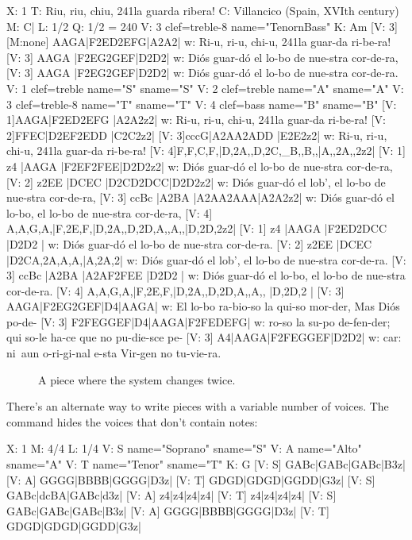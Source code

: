 \documentclass[a4paper,fullpage,12pt]{book}
\begin{document}
{\small
\begin{abcsource}
X: 1
T: Riu, riu, chiu, \bl{}241la guarda ribera!
C: Villancico (Spain, XVIth century)
M: C|
L: 1/2
Q: 1/2 = 240
V: 3 clef=treble-8 name="Tenor\bl{}nBass"
K: Am
[V: 3] [M:none] AAGA|F2ED2EFG|A2A2|
w: Ri-u, ri-u, chi-u, \bl{}241la guar-da ri-be-ra!
[V: 3] AAGA         |F2EG2GEF|D2D2|
w: Di\'os guar-d\'o el lo-bo de nue-stra cor-de-ra,
[V: 3] AAGA         |F2EG2GEF|D2D2|
w: Di\'os guar-d\'o el lo-bo de nue-stra cor-de-ra.
V: 1 clef=treble   name="S" sname="S"
V: 2 clef=treble   name="A" sname="A"
V: 3 clef=treble-8 name="T" sname="T"
V: 4 clef=bass     name="B" sname="B"
[V: 1]AAGA|F2ED2EFG |A2A2z2|
w: Ri-u, ri-u, chi-u, \bl{}241la guar-da ri-be-ra!
[V: 2]FFEC|D2EF2EDD |C2C2z2|
[V: 3]cccG|A2AA2ADD |E2E2z2|
w: Ri-u, ri-u, chi-u, \bl{}241la guar-da ri-be-ra!
[V: 4]F,F,C,F,|D,2A,,D,2C,_B,,B,,|A,,2A,,2z2|
%
[V: 1] z4      |AAGA   |F2EF2FEE|D2D2z2|
w: Di\'os guar-d\'o el lo-bo de nue-stra cor-de-ra,
[V: 2] z2EE    |DCEC   |D2CD2DCC|D2D2z2|
w: Di\'os guar-d\'o el lob', el lo-bo de nue-stra cor-de-ra,
[V: 3] ccBc    |A2BA   |A2AA2AAA|A2A2z2|
w: Di\'os guar-d\'o el lo-bo, el lo-bo de nue-stra cor-de-ra,
[V: 4] A,A,G,A,|F,2E,F,|D,2A,,D,2D,A,,A,,|D,2D,2z2|
%
[V: 1] z4      |AAGA   |F2ED2DCC    |D2D2  |
w: Di\'os guar-d\'o el lo-bo de nue-stra cor-de-ra.
[V: 2] z2EE    |DCEC   |D2CA,2A,A,A,|A,2A,2|
w: Di\'os guar-d\'o el lob', el lo-bo de nue-stra cor-de-ra.
[V: 3] ccBc    |A2BA   |A2AF2FEE    |D2D2  |
w: Di\'os guar-d\'o el lo-bo, el lo-bo de nue-stra cor-de-ra.
[V: 4] A,A,G,A,|F,2E,F,|D,2A,,D,2D,A,,A,,  |D,2D,2  |
[V: 3] AAGA|F2EG2GEF|D4|AAGA|
w: El lo-bo ra-bio-so la qui-so mor-der, Mas Di\'os po-de-
[V: 3] F2FEGGEF|D4|AAGA|F2FEDEFG|
w: ro-so la su-po de-fen-der; qui so-le ha-ce que no pu-die-sce pe-
[V: 3] A4|AAGA|F2FEGGEF|D2D2|
w: car: ni~aun o-ri-gi-nal e-sta Vir-gen no tu-vie-ra.
\end{abcsource}
}

\begin{figure}[htbp]
\caption{A piece where the system changes twice.}
\label{fig:riuriuchiu}
\end{figure}

There's an alternate way to write pieces with a variable number of
voices. The command  hides the voices that
don't contain notes:

\begin{abcsource}
X: 1
M: 4/4
L: 1/4
V: S name="Soprano" sname="S"
V: A name="Alto"    sname="A"
V: T name="Tenor"   sname="T"
K: G
[V: S] GABc|GABc|GABc|B3z|
[V: A] GGGG|BBBB|GGGG|D3z|
[V: T] GDGD|GDGD|GGDD|G3z|
%
[V: S] GABc|dcBA|GABc|d3z|
[V: A] z4|z4|z4|z4|
[V: T] z4|z4|z4|z4|
%
[V: S] GABc|GABc|GABc|B3z|
[V: A] GGGG|BBBB|GGGG|D3z|
[V: T] GDGD|GDGD|GGDD|G3z|
\end{abcsource}
\end{document}
